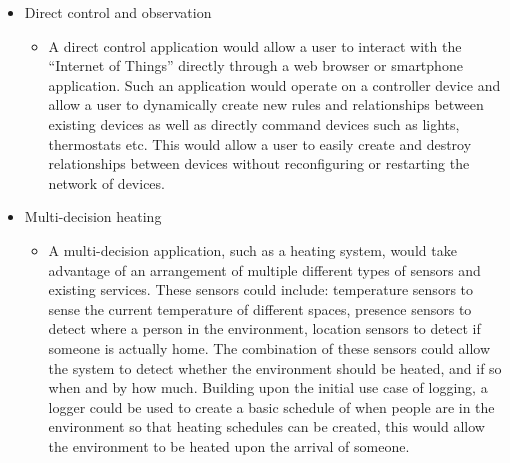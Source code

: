 \begin{itemize}
\begin{itemize}
	\end{itemize}
	\item Direct control and observation
	\begin{itemize}
		\item A direct control application would allow a user to interact with the ``Internet of Things'' directly through a web browser or smartphone application. Such an application would operate on a controller device and allow a user to dynamically create new rules and relationships between existing devices as well as directly command devices such as lights, thermostats etc.
		This would allow a user to easily create and destroy relationships between devices without reconfiguring or restarting the network of devices.
	\end{itemize}
	\item Multi-decision heating
	\begin{itemize}
		\item A multi-decision application, such as a heating system, would take advantage of an arrangement of multiple different types of sensors and existing services. These sensors could include: temperature sensors to sense the current temperature of different spaces, presence sensors to detect where a person in the environment, location sensors to detect if someone is actually home. The combination of these sensors could allow the system to detect whether the environment should be heated, and if so when and by how much. Building upon the initial use case of logging, a logger could be used to create a basic schedule of when people are in the environment so that heating schedules can be created, this would allow the environment to be heated upon the arrival of someone.
	\end{itemize}
\end{itemize}



